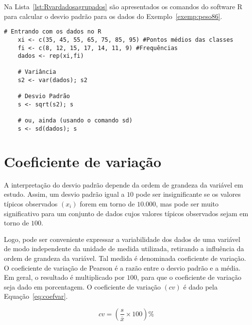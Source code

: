 \documentclass[11pt,fleqn]{book} %
\begin{document}
\vspace{0,3cm}


Na Lista~\ref{lst:Rvardadosagrupados} são apresentados os comandos do software R para calcular o desvio padrão para os dados do Exemplo~\ref{exemp:peso86}. \\

\begin{scriptsize}
	\estiloR
	\begin{lstlisting}[caption={Comandos do software R}, label=lst:Rvardadosagrupados]
	# Entrando com os dados no R
	xi <- c(35, 45, 55, 65, 75, 85, 95) #Pontos médios das classes
	fi <- c(8, 12, 15, 17, 14, 11, 9) #Frequências
	dados <- rep(xi,fi)
	
	# Variância
	s2 <- var(dados); s2
	
	# Desvio Padrão
	s <- sqrt(s2); s
	
	# ou, ainda (usando o comando sd)
	s <- sd(dados); s

	\end{lstlisting}
\end{scriptsize}





\section{Coeficiente de variação}

A interpretação do desvio padrão depende da ordem de grandeza da variável em estudo. Assim, um desvio padrão igual a $10$ pode ser insignificante se os valores típicos observados $(x_i)$ forem em torno de $10.000$, mas pode ser muito significativo para um conjunto de dados cujos valores típicos observados sejam em torno de $100$.

Logo, pode ser conveniente expressar a variabilidade dos dados de uma variável de modo independente da unidade de medida utilizada, retirando a influência da ordem de grandeza da variável. Tal medida é denominada coeficiente de variação. O coeficiente de variação de Pearson é a razão entre o desvio padrão e a média. Em geral, o resultado é multiplicado por $100$, para que o coeficiente de variação seja dado em porcentagem. O coeficiente de variação $(cv)$ é dado pela Equação~\ref{eq:coefvar}. \\

\begin{eBox}
\vspace{-0.5cm}
\begin{equation} \label{eq:coefvar}
cv=\left(\frac{s}{\bar{x}} \times 100\right)\% 
\end{equation}
\end{eBox}
\end{document}
